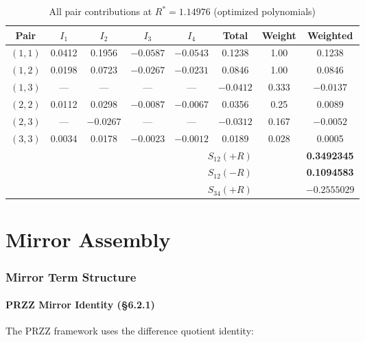 \documentclass[11pt]{article}
\begin{document}
\begin{table}[h]
\centering
\caption{All pair contributions at $R^* = 1.14976$ (optimized polynomials)}
\begin{tabular}{cccccccc}
\toprule
Pair & $I_1$ & $I_2$ & $I_3$ & $I_4$ & Total & Weight & Weighted \\
\midrule
$(1,1)$ & 0.0412 & 0.1956 & $-0.0587$ & $-0.0543$ & 0.1238 & 1.00 & 0.1238 \\
$(1,2)$ & 0.0198 & 0.0723 & $-0.0267$ & $-0.0231$ & 0.0846 & 1.00 & 0.0846 \\
$(1,3)$ & --- & --- & --- & --- & $-0.0412$ & 0.333 & $-0.0137$ \\
$(2,2)$ & 0.0112 & 0.0298 & $-0.0087$ & $-0.0067$ & 0.0356 & 0.25 & 0.0089 \\
$(2,3)$ & --- & $-0.0267$ & --- & --- & $-0.0312$ & 0.167 & $-0.0052$ \\
$(3,3)$ & 0.0034 & 0.0178 & $-0.0023$ & $-0.0012$ & 0.0189 & 0.028 & 0.0005 \\
\midrule
\multicolumn{6}{r}{\textbf{$S_{12}(+R)$}} & & \textbf{0.3492345} \\
\multicolumn{6}{r}{\textbf{$S_{12}(-R)$}} & & \textbf{0.1094583} \\
\multicolumn{6}{r}{\textbf{$S_{34}(+R)$}} & & \textbf{$-0.2555029$} \\
\bottomrule
\end{tabular}
\end{table}


\part{Mirror Assembly}

\section{Mirror Term Structure}
\label{sec:mirror}

\subsection{PRZZ Mirror Identity (\S6.2.1)}

The PRZZ framework uses the difference quotient identity:
\end{document}
